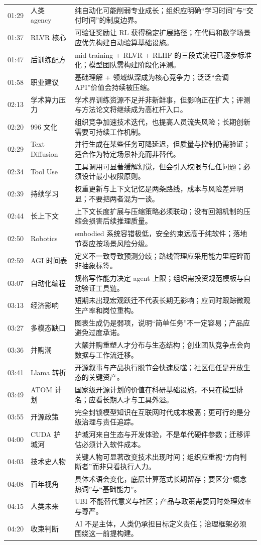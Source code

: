 \documentclass[a4paper]{article}
\begin{document}
\begin{longtable}{p{}p{}p{}}
01:29 & 人类 agency & 纯自动化可能削弱专业成长；组织应明确“学习时间”与“交付时间”的制度边界。 \\
01:37 & RLVR 核心 & 可验证奖励让 RL 获得稳定扩展路径；在代码和数学场景应优先构建自动验算基础设施。 \\
01:47 & 后训练配方 & mid-training + RLVR + RLHF 的三段式流程已逐步标准化；模型团队需构建阶段化评测。 \\
01:58 & 职业建议 & 基础理解 + 领域纵深成为核心竞争力；泛泛“会调 API”价值会持续被压缩。 \\
02:13 & 学术算力压力 & 学术界训练资源不足并非新鲜事，但影响正在扩大；评测与方法论文将继续成为高杠杆入口。 \\
02:20 & 996 文化 & 组织竞争加速技术迭代，也提高人员流失风险；长期创新需要可持续工作机制。 \\
02:29 & Text Diffusion & 并行生成在某些任务可降延迟，但质量与控制仍需验证；适合作为特定场景补充而非替代。 \\
02:34 & Tool Use & 工具调用可显著缓解幻觉，但会引入权限与信任问题；必须设计最小权限原则。 \\
02:39 & 持续学习 & 权重更新与上下文记忆是两条路线，成本与风险差异明显；不要把两者混为一谈。 \\
02:44 & 长上下文 & 上下文长度扩展与压缩策略必须联动；没有回溯机制的压缩会损害后续推理质量。 \\
02:50 & Robotics & embodied 系统容错极低，安全约束远高于纯软件；落地节奏应按场景风险分级。 \\
02:59 & AGI 时间表 & 定义不一致导致预测分歧；路线管理应采用能力里程碑而非抽象标签。 \\
03:07 & 自动化编程 & 规格写作能力决定 agent 上限；组织需投资规范模板与自动验证工具链。 \\
03:13 & 经济影响 & 短期未出现宏观跃迁不代表长期无影响；应同时跟踪微观生产率和岗位重构。 \\
03:27 & 多模态缺口 & 图表生成仍是弱项，说明“简单任务”不一定容易；产品应避免过度承诺。 \\
03:36 & 并购潮 & 大额并购重塑人才分布与生态结构；创业团队竞争点会向数据与工作流迁移。 \\
03:41 & Llama 转折 & 开源叙事与产品执行脱节会快速反噬；社区信任是开放生态的关键资产。 \\
03:49 & ATOM 计划 & 国家级开源计划的价值在科研基础设施，不只在模型排名；应看长期人才与工具外溢。 \\
03:55 & 开源政策 & 完全封锁模型知识在互联网时代成本极高；更可行的是分级治理与责任追踪。 \\
04:00 & CUDA 护城河 & 护城河来自生态与开发体验，不是单代硬件参数；迁移评估必须计入软件成本。 \\
04:03 & 技术史人物 & 关键人物可显著改变技术出现时间；组织应重视“方向判断者”而非只看执行人力。 \\
04:08 & 百年视角 & 具体术语会变化，底层计算范式长期留存；要区分“概念热词”与“基础能力”。 \\
04:15 & 人类未来 & UBI 不能替代意义与社区；产品与政策需要同时处理效率与尊严。 \\
04:20 & 收束判断 & AI 不是主体，人类仍承担目标定义责任；治理框架必须围绕这一前提构建。 \\
\bottomrule
\end{longtable}
\end{document}
